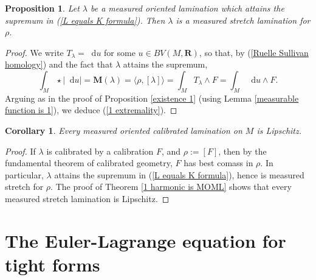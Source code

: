 \documentclass[reqno,11pt]{amsart}
\newcommand{\RR}{\mathbf{R}}
\newcommand*\dif{\mathop{}\!\mathrm{d}}
\newcommand{\Mass}{\mathbf M}
\newtheorem{proposition}[theorem]{Proposition}
\newtheorem{corollary}[theorem]{Corollary}
\theoremstyle{definition}
\numberwithin{equation}{section}
\begin{document}
\begin{proposition}\label{calibrated means measured stretch}
Let $\lambda$ be a measured oriented lamination which attains the supremum in (\ref{L equals K formula}).
Then $\lambda$ is a measured stretch lamination for $\rho$.
\end{proposition}
\begin{proof}
We write $T_\lambda = \dif u$ for some $u \in BV(M, \RR)$, so that, by (\ref{Ruelle Sullivan homology}) and the fact that $\lambda$ attains the supremum,
$$\int_M \star |\dif u| = \Mass(\lambda) = \langle \rho, [\lambda]\rangle = \int_M T_\lambda \wedge F = \int_M \dif u \wedge F.$$
Arguing as in the proof of Proposition \ref{existence 1} (using Lemma \ref{measurable function is 1}), we deduce (\ref{1 extremality}).
\end{proof}

\begin{corollary}
Every measured oriented calibrated lamination on $M$ is Lipschitz.
\end{corollary}
\begin{proof}
If $\lambda$ is calibrated by a calibration $F$, and $\rho := [F]$, then by the fundamental theorem of calibrated geometry, $F$ has best comass in $\rho$.
In particular, $\lambda$ attains the supremum in (\ref{L equals K formula}), hence is measured stretch for $\rho$.
The proof of Theorem \ref{1 harmonic is MOML} shows that every measured stretch lamination is Lipschitz.
\end{proof}

\section{The Euler-Lagrange equation for tight forms}\label{infinityMax}
\end{document}
